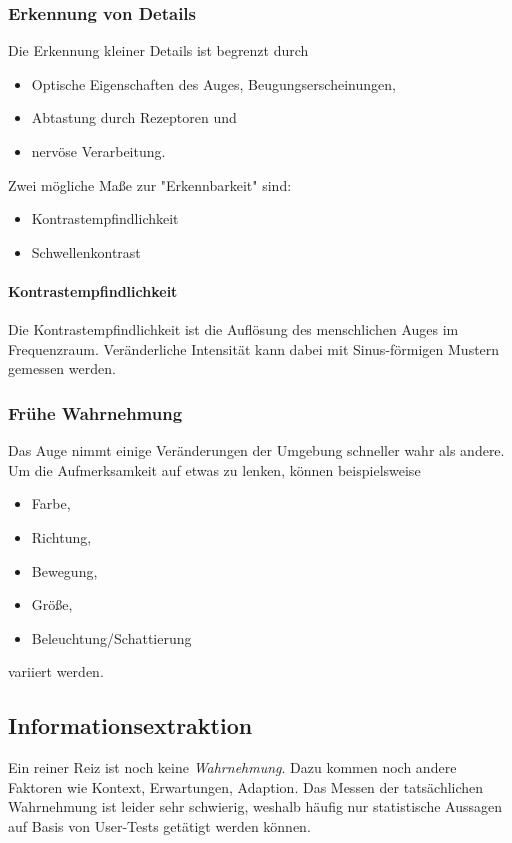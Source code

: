 
			\subsubsection{Erkennung von Details}
				Die Erkennung kleiner Details ist begrenzt durch
				\begin{itemize}
					\item Optische Eigenschaften des Auges, \zB Beugungserscheinungen,
					\item Abtastung durch Rezeptoren und
					\item nervöse Verarbeitung.
				\end{itemize}
				Zwei mögliche Maße zur "Erkennbarkeit" sind:
				\begin{itemize}
					\item Kontrastempfindlichkeit
					\item Schwellenkontrast
				\end{itemize}

				\paragraph{Kontrastempfindlichkeit}
					Die Kontrastempfindlichkeit ist die Auflösung des menschlichen Auges im Frequenzraum. Veränderliche Intensität kann dabei mit Sinus-förmigen Mustern gemessen werden.

			\subsubsection{Frühe Wahrnehmung}
				Das Auge nimmt einige Veränderungen der Umgebung schneller wahr als andere. Um die Aufmerksamkeit auf etwas zu lenken, können beispielsweise
				\begin{itemize}
					\item Farbe,
					\item Richtung,
					\item Bewegung,
					\item Größe,
					\item Beleuchtung/Schattierung
				\end{itemize}
				variiert werden.

		\subsection{Informationsextraktion}
			Ein reiner Reiz ist noch keine \emph{Wahrnehmung}. Dazu kommen noch andere Faktoren wie Kontext, Erwartungen, Adaption. Das Messen der tatsächlichen Wahrnehmung ist leider sehr schwierig, weshalb häufig nur statistische Aussagen auf Basis von User-Tests getätigt werden können.

